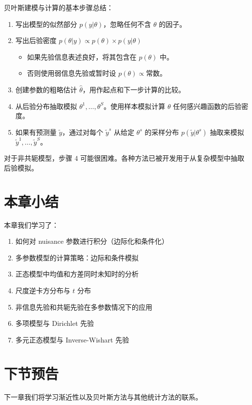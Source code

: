 贝叶斯建模与计算的基本步骤总结：

\begin{enumerate}
  \item 写出模型的似然部分 $p(y|\theta)$，忽略任何不含 $\theta$ 的因子。
  \item 写出后验密度 $p(\theta|y) \propto p(\theta) \times p(y|\theta)$
    \begin{itemize}
      \item 如果先验信息表述良好，将其包含在 $p(\theta)$ 中。
      \item 否则使用弱信息先验或暂时设 $p(\theta) \propto \text{常数}$。
    \end{itemize}
  \item 创建参数的粗略估计 $\hat{\theta}$，用作起点和下一步计算的比较。
  \item 从后验分布抽取模拟 $\theta^1, \ldots, \theta^S$。使用样本模拟计算 $\theta$ 任何感兴趣函数的后验密度。
  \item 如果有预测量 $\tilde{y}$，通过对每个 $\tilde{y}^s$ 从给定 $\theta^s$ 的采样分布 $p(\tilde{y}|\theta^s)$ 抽取来模拟 $\tilde{y}^1, \ldots, \tilde{y}^S$。
\end{enumerate}

对于非共轭模型，步骤 4 可能很困难。各种方法已被开发用于从复杂模型中抽取后验模拟。

\section{本章小结}

本章我们学习了：
\begin{enumerate}
  \item 如何对 nuisance 参数进行积分（边际化和条件化）
  \item 多参数模型的计算策略：边际和条件模拟
  \item 正态模型中均值和方差同时未知时的分析
  \item 尺度逆卡方分布与 $t$ 分布
  \item 非信息先验和共轭先验在多参数情况下的应用
  \item 多项模型与 Dirichlet 先验
  \item 多元正态模型与 Inverse-Wishart 先验
\end{enumerate}

\section{下节预告}

下一章我们将学习渐近性以及贝叶斯方法与其他统计方法的联系。

\endinput
